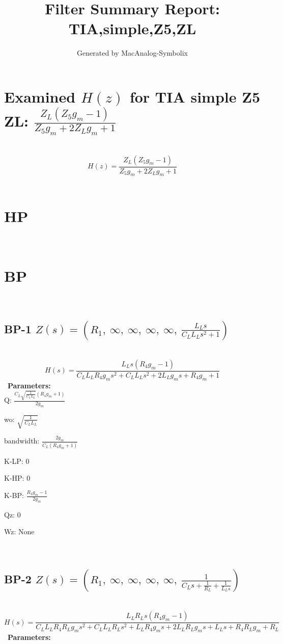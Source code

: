 \documentclass{article}
\begin{document}
        
                        \title{Filter Summary Report: TIA,simple,Z5,ZL}
                        \author{Generated by MacAnalog-Symbolix}
                        \maketitle

                        \tableofcontents
                        \newpage
                        \section{Examined $H(z)$ for TIA simple Z5 ZL: $\frac{Z_{L} \left(Z_{5} g_{m} - 1\right)}{Z_{5} g_{m} + 2 Z_{L} g_{m} + 1}$ }\ 
\textbf{\[H(z) = \frac{Z_{L} \left(Z_{5} g_{m} - 1\right)}{Z_{5} g_{m} + 2 Z_{L} g_{m} + 1}\] }\ 
\section{HP}\ 
\section{BP}\ 
\subsection{BP-1 $Z(s) = \left( R_{1}, \  \infty, \  \infty, \  \infty, \  \infty, \  \frac{L_{L} s}{C_{L} L_{L} s^{2} + 1}\right)$ } \ 
\textbf{\[H(s) = \frac{L_{L} s \left(R_{4} g_{m} - 1\right)}{C_{L} L_{L} R_{4} g_{m} s^{2} + C_{L} L_{L} s^{2} + 2 L_{L} g_{m} s + R_{4} g_{m} + 1}\] } \ 
\textbf{Parameters:}\\ 

Q: $\frac{C_{L} \sqrt{\frac{1}{C_{L} L_{L}}} \left(R_{4} g_{m} + 1\right)}{2 g_{m}}$\ 

wo: $\sqrt{\frac{1}{C_{L} L_{L}}}$\ 

bandwidth: $\frac{2 g_{m}}{C_{L} \left(R_{4} g_{m} + 1\right)}$\ 

K-LP: $0$\ 

K-HP: $0$\ 

K-BP: $\frac{R_{4} g_{m} - 1}{2 g_{m}}$\ 

Qz: $0$\ 

Wz: $\text{None}$\ 

\ 

\subsection{BP-2 $Z(s) = \left( R_{1}, \  \infty, \  \infty, \  \infty, \  \infty, \  \frac{1}{C_{L} s + \frac{1}{R_{L}} + \frac{1}{L_{L} s}}\right)$ } \ 
\textbf{\[H(s) = \frac{L_{L} R_{L} s \left(R_{4} g_{m} - 1\right)}{C_{L} L_{L} R_{4} R_{L} g_{m} s^{2} + C_{L} L_{L} R_{L} s^{2} + L_{L} R_{4} g_{m} s + 2 L_{L} R_{L} g_{m} s + L_{L} s + R_{4} R_{L} g_{m} + R_{L}}\] } \ 
\textbf{Parameters:}\\ 
\end{document}
